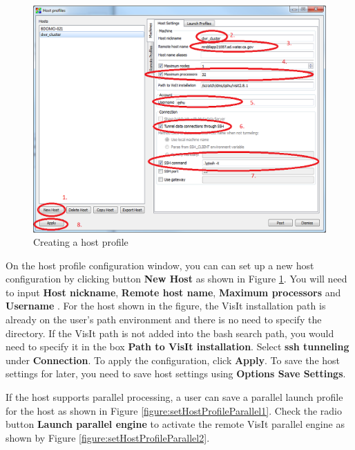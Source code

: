 \documentclass[12pt]{report}
\begin{document}
        \begin{figure}
        \begin{center}
        \includegraphics{setHostProfile}
        \caption{Creating a host profile}
        \label{figure:setHostProfile}
        \end{center}
        \end{figure}

On the host profile configuration window, you can can set up a  new host configuration by clicking button {\bf New Host} as shown in Figure \ref{figure:setHostProfile}.  You will need to input {\bf Host nickname}, {\bf Remote host name}, {\bf Maximum processors} and {\bf Username }. For the host shown in the figure, the VisIt installation path is already on the user's path environment and there is no need to specify the directory. If the VisIt path is not added into the bash search path, you would need to specify it in the box  {\bf Path to VisIt installation}.  Select {\bf ssh tunneling} under {\bf Connection}. To apply the configuration, click {\bf Apply}. To save the host settings for later, you need to save host settings using {\bf Options \textrightarrow Save Settings}.


If the host supports parallel processing, a user can save a parallel launch profile for the host as shown in Figure \ref{figure:setHostProfileParallel1}. Check the radio button {\bf Launch parallel engine} to activate the remote VisIt parallel engine as shown by Figure \ref{figure:setHostProfileParallel2}.   
\end{document}

